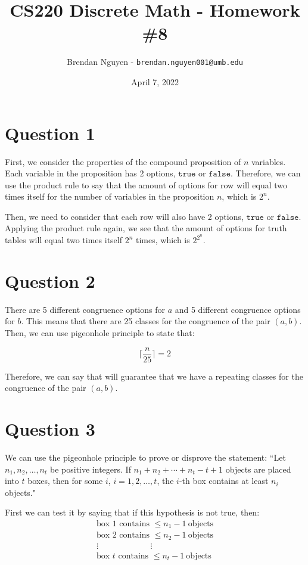 \documentclass[11pt]{article}
\title{CS220 Discrete Math - Homework \#8}
\author{Brendan Nguyen - \texttt{brendan.nguyen001@umb.edu}}
\date{April 7, 2022}
\begin{document}
\maketitle

\section*{Question 1}
First, we consider the properties of the compound proposition of $n$ variables. Each variable in the proposition has 2 options, $\texttt{true}$ or $\texttt{false}$. Therefore, we can use the product rule to say that the amount of options for row will equal two times itself for the number of variables in the proposition $n$, which is $2^n$.

Then, we need to consider that each row will also have 2 options, $\texttt{true}$ or $\texttt{false}$. Applying the product rule again, we see that the amount of options for truth tables will equal two times itself $2^n$ times, which is $2^{2^n}$.

\section*{Question 2}
There are 5 different congruence options for $a$ and 5 different congruence options for $b$. This means that there are 25 classes for the congruence of the pair $(a, b)$. Then, we can use pigeonhole principle to state that:

\[\Big\lceil\frac{n}{25}\Big\rceil = 2\]

Therefore, we can say that  will guarantee that we have a repeating classes for the congruence of the pair $(a, b)$.

\section*{Question 3}
We can use the pigeonhole principle to prove or disprove the statement: ``Let $n_1,n_2,\ldots,n_t$ be positive integers. If $n_1 + n_2 + \cdots + n_t - t + 1$ objects are placed into $t$ boxes, then for some $i$, $i = 1,2,\ldots,t$, the $i$-th box contains at least $n_i$ objects."

First we can test it by saying that if this hypothesis is not true, then:
\begin{gather*}
    \text{box 1 contains } \leq n_1 - 1\ \text{objects}\\
    \text{box 2 contains } \leq n_2 - 1\ \text{objects}\\
    \vdots\hspace{75pt}\vdots\\
    \text{box $t$ contains } \leq n_t - 1\ \text{objects}
\end{gather*}
\end{document}
